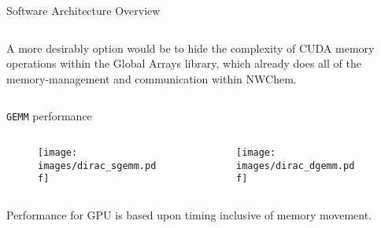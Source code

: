 \documentclass[final]{beamer}
\begin{document}
\begin{columns}[t]
\begin{column}{.33\linewidth}
\begin{block}{Software Architecture Overview}
\begin{columns}[t]
\begin{column}{.46\linewidth}
\begin{figure}[hctp]
                    \end{figure}
                    A more desirably option would be to hide the complexity of CUDA memory operations within the Global Arrays library, which already does all of the memory-management and communication within NWChem.
                \end{column}
            \end{columns}
        \end{block}
        \begin{block}{\texttt{GEMM} performance}
            \begin{columns}[t]
                \begin{column}{.46\linewidth}
                    \begin{figure}[hctp]
                        \texttt{[image: images/dirac\_sgemm.pdf]}
                    \end{figure}
                \end{column}
                \begin{column}{.46\linewidth}
                    \begin{figure}[hctp]
                        \texttt{[image: images/dirac\_dgemm.pdf]}
                    \end{figure}
                \end{column}
            \end{columns}
            Performance for GPU is based upon timing inclusive of memory movement.
        \end{block}
      \end{column}
      \begin{column}{.33\linewidth}
\end{column}
\end{columns}
\end{document}
